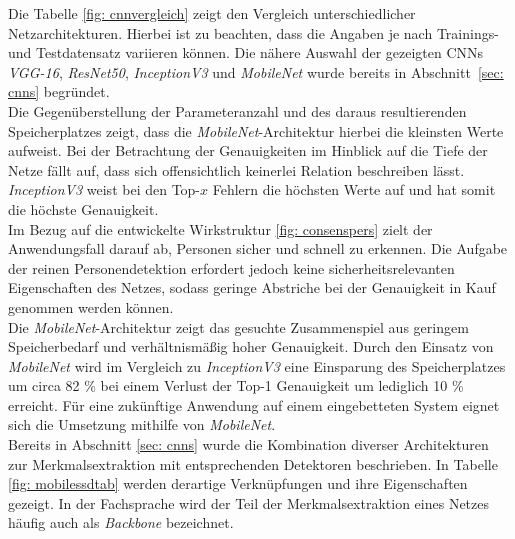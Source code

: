 		
		
	
		
		Die Tabelle \ref{fig: cnnvergleich} zeigt den Vergleich unterschiedlicher Netzarchitekturen. Hierbei ist zu beachten, dass die Angaben je nach Trainings- und Testdatensatz variieren können. Die nähere Auswahl der gezeigten CNNs \textit{VGG-16}, \textit{ResNet50}, \textit{InceptionV3} und \textit{MobileNet} wurde bereits in Abschnitt~\ref{sec: cnns} begründet.\\
		
				
		
		Die Gegenüberstellung der Parameteranzahl und des daraus resultierenden Speicherplatzes zeigt, dass die \textit{MobileNet}-Architektur hierbei die kleinsten Werte aufweist. Bei der Betrachtung der Genauigkeiten im Hinblick auf die Tiefe der Netze fällt auf, dass sich offensichtlich keinerlei Relation beschreiben lässt. \textit{InceptionV3} weist bei den Top-$x$ Fehlern die höchsten Werte auf und hat somit die höchste Genauigkeit.\\
		
		Im Bezug auf die entwickelte Wirkstruktur \ref{fig: consenspers} zielt der Anwendungsfall darauf ab, Personen sicher und schnell zu erkennen. Die Aufgabe der reinen Personendetektion erfordert jedoch keine sicherheitsrelevanten Eigenschaften des Netzes, sodass geringe Abstriche bei der Genauigkeit in Kauf genommen werden können.\\
		
		Die \textit{MobileNet}-Architektur zeigt das gesuchte Zusammenspiel aus geringem Speicherbedarf und verhältnismäßig hoher Genauigkeit. Durch den Einsatz von \textit{MobileNet} wird im Vergleich zu \textit{InceptionV3} eine Einsparung des Speicherplatzes um circa 82 \% bei einem Verlust der Top-1 Genauigkeit um lediglich 10 \% erreicht. Für eine zukünftige Anwendung auf einem eingebetteten System eignet sich die Umsetzung mithilfe von \textit{MobileNet}.\\
		
		
		
		Bereits in Abschnitt \ref{sec: cnns} wurde die Kombination diverser Architekturen zur Merkmalsextraktion mit entsprechenden Detektoren beschrieben. In Tabelle \ref{fig: mobilessdtab} werden derartige Verknüpfungen und ihre Eigenschaften gezeigt. In der Fachsprache wird der Teil der Merkmalsextraktion eines Netzes häufig auch als \textit{Backbone} bezeichnet.\\
		
